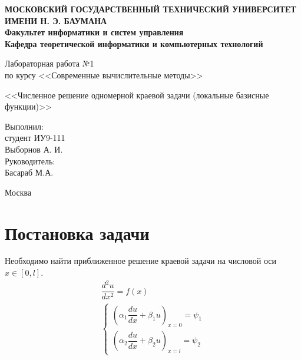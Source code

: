 \documentclass[12pt,a4paper,oneside]{extarticle}
\begin{document}
\pgfplotsset{compat=1.8}

\thispagestyle{empty}
\newpage
{
\centering


\textbf{
МОСКОВСКИЙ ГОСУДАРСТВЕННЫЙ ТЕХНИЧЕСКИЙ УНИВЕРСИТЕТ ИМЕНИ Н. Э. БАУМАНА \\
Факультет информатики и систем управления \\
Кафедра теоретической информатики и компьютерных технологий}
\bigskip
\bigskip
\bigskip
\bigskip
\bigskip
\bigskip
\bigskip

\vfill


Лабораторная работа №1 \\
по курсу <<Современные вычислительные методы>>

\bigskip

{\large <<Численное решение одномерной краевой задачи (локальные базисные функции)>>}
\bigskip

\vfill



\hfill\parbox{4cm} {
Выполнил:\\
студент ИУ9-111 \hfill \\
Выборнов А. И.\hfill \medskip\\
Руководитель:\\
Басараб М.А.\hfill
}


\vspace{\fill}

Москва \number\year
\clearpage
}

\clearpage



\section{Постановка задачи}
    Необходимо найти приближенное решение краевой задачи на числовой оси $x \in [0, l]$.
    \begin{gather}
        \dfrac{d^2u}{dx^2} = f(x) \nonumber \\
        \begin{cases}
            \left( \alpha_1 \dfrac{du}{dx} + \beta_1 u \right)_{x=0} = \psi_1 \nonumber \\
            \left( \alpha_2 \dfrac{du}{dx} + \beta_2 u \right)_{x=l} = \psi_2 \nonumber
        \end{cases}
    \end{gather}
    
\end{document}
